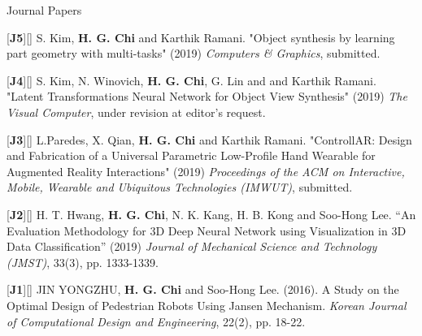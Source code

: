 


\begin{cventries}

\cvpub
{Journal Papers} %
{ %
\begin{cvitems}
\item {[\textbf{J5}][\href{https://docs.google.com/viewer?url=https://github.com/stnoah1/CV/raw/master/documents/cng19.pdf}{}] S. Kim, \textbf{H. G. Chi} and Karthik Ramani. "Object synthesis by learning part geometry with multi-tasks" (2019) \textit{Computers \& Graphics}, submitted.}
\item {[\textbf{J4}][\href{https://docs.google.com/viewer?url=https://github.com/stnoah1/CV/raw/master/documents/VisualComputer.pdf}{}] S. Kim, N. Winovich, \textbf{H. G. Chi}, G. Lin and and Karthik Ramani. "Latent Transformations Neural Network for Object View Synthesis" (2019) \textit{The Visual Computer}, under revision at editor's request.}
\item {[\textbf{J3}][\href{https://docs.google.com/viewer?url=https://github.com/stnoah1/CV/raw/master/documents/ControllAR.pdf}{}] L.Paredes, X. Qian, \textbf{H. G. Chi} and Karthik Ramani. "ControllAR: Design and Fabrication of a Universal Parametric Low-Profile Hand Wearable for Augmented Reality Interactions" (2019) \textit{Proceedings of the ACM on Interactive, Mobile, Wearable and Ubiquitous Technologies (IMWUT)}, submitted.}
\item {[\textbf{J2}][\href{https://link.springer.com/content/pdf/10.1007/s12206-019-0233-1.pdf}{}] H. T. Hwang, \textbf{H. G. Chi}, N. K. Kang, H. B. Kong and Soo-Hong Lee. “An Evaluation Methodology for 3D Deep Neural Network using Visualization in 3D Data Classification” (2019) \textit{Journal of Mechanical Science and Technology (JMST)}, 33(3), pp. 1333-1339.}
\item {[\textbf{J1}][\href{https://docs.google.com/viewer?url=https://github.com/stnoah1/CV/raw/master/documents/Edison.pdf}{}] JIN YONGZHU, \textbf{H. G. Chi} and Soo-Hong Lee. (2016). A Study on the Optimal Design of Pedestrian Robots Using Jansen Mechanism. \textit{Korean Journal of Computational Design and Engineering}, 22(2), pp. 18-22.}
\end{cvitems}
}


\end{cventries}
